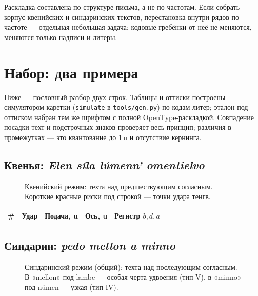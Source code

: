 \documentclass[11pt,a4paper]{article}
\newlength\tgem \setlength\tgem{5mm}
\newcommand\tgu{0.001\tgem}
\newcommand\code[1]{\texttt{#1}}
\begin{document}
Раскладка составлена по структуре письма, а не по частотам. Если собрать корпус квенийских и синдаринских текстов, перестановка внутри рядов по частоте — отдельная небольшая задача; кодовые гребёнки от неё не меняются, меняются только надписи и литеры.

\section{Набор: два примера}

Ниже — пословный разбор двух строк. Таблицы и оттиски построены симулятором каретки (\code{simulate} в \code{tools/gen.py}) по кодам литер; эталон под оттиском набран тем же шрифтом с полной OpenType-раскладкой. Совпадение посадки техт и подстрочных знаков проверяет весь принцип; различия в промежутках — это квантование до 1\,u и отсутствие кернинга.

\subsection{Квенья: \emph{Elen síla lúmenn' omentielvo}}

\begin{figure}[h]
\centering
\setlength\tgem{12.5mm}
\begin{tikzpicture}[x=\tgu,y=\tgu]

\end{tikzpicture}
\caption{Квенийский режим: техта над предшествующим согласным. Короткие красные риски под строкой — точки удара тенгв.}
\end{figure}

{\small\setlength\tgem{5mm}
\begin{longtable}{@{}rlrrl@{}}
\toprule
\# & Удар & Подача, u & Ось, u & Регистр $b, d, a$ \\
\midrule\endhead

\bottomrule
\end{longtable}}

\subsection{Синдарин: \emph{pedo mellon a minno}}

\begin{figure}[h]
\centering
\setlength\tgem{14mm}
\begin{tikzpicture}[x=\tgu,y=\tgu]

\end{tikzpicture}
\caption{Синдаринский режим (общий): техта над последующим согласным. В «mellon» под lambe — особая черта удвоения (тип V), в «minno» под númen — узкая (тип IV).}
\end{figure}
\end{document}
